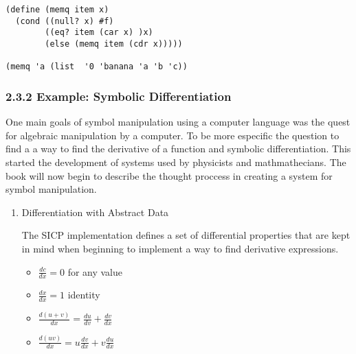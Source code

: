 \documentclass[11pt]{article}
\begin{document}
\begin{verbatim}
(define (memq item x)
  (cond ((null? x) #f)
        ((eq? item (car x) )x)
        (else (memq item (cdr x)))))

(memq 'a (list  '0 'banana 'a 'b 'c))
\end{verbatim}

\subsubsection{2.3.2 Example: Symbolic Differentiation}
\label{sec:org59e061e}

One main goals of symbol manipulation using a computer language was the quest for
algebraic manipulation by a computer. To be more especific the question to find a
a way to find the derivative of a function and symbolic differentiation. This started
the development of systems used by physicists and mathmathecians. The book will
now begin to describe the thought proccess in creating a system for symbol manipulation.

\begin{enumerate}
\item Differentiation with Abstract Data
\label{sec:org31de73a}

The SICP implementation defines a set of differential properties that are kept in
mind when beginning to implement a way to find derivative expressions.

\begin{itemize}
\item \(\frac{dc}{dx} = 0\) for any value
\item \(\frac{dx}{dx} = 1\) identity
\item \(\frac{d(u + v)}{dx} = \frac{du}{dv} + \frac{dv}{dx}\)
\item \(\frac{d(u  v)}{dx} = u  \frac{dv}{dx} + v  \frac{du}{dx}\)
\end{itemize}
\end{enumerate}
\end{document}
